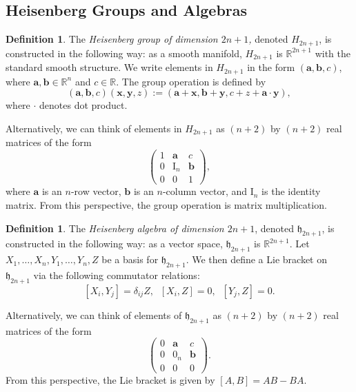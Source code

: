 \documentclass{amsart}[]
\newcommand{\R}{\mathbb R}
\theoremstyle{plain}
\theoremstyle{definition}
\newtheorem{definition}[theorem]{Definition}
\theoremstyle{remark}
\begin{document}
	\subsection{Heisenberg Groups and Algebras}
	\begin{definition}
		The \emph{Heisenberg group of dimension $2n+1$,} denoted $H_{2n+1}$, is constructed in the following way: as a smooth manifold, $H_{2n+1}$ is $\R^{2n+1}$ with the standard smooth structure. We write elements in $H_{2n+1}$ in the form $(\mathbf a, \mathbf b, c)$, where $\mathbf a, \mathbf b \in \R^n$ and $c \in \R$. The group operation is defined by
		$$(\mathbf a, \mathbf b,c ) (\mathbf x,\mathbf y,z) := (\mathbf a + \mathbf x, \mathbf b + \mathbf y, c + z + \mathbf a \cdot \mathbf y),$$
		where $\cdot$ denotes dot product. 
		
		Alternatively, we can think of elements in $H_{2n+1}$ as $(n+2)$ by $(n+2)$ real matrices of the form 
		$$\begin{pmatrix}
			1 & \mathbf a & c \\
			0 & \text{I}_n & \mathbf b \\
			0 & 0 & 1
		\end{pmatrix},$$
		where $\mathbf a$ is an $n$-row vector, $\mathbf b$ is an $n$-column vector, and $\text{I}_n$ is the identity matrix.
		From this perspective, the group operation is matrix multiplication.
	\end{definition}
	
	
	\begin{definition}
		The \emph{Heisenberg algebra of dimension $2n+1$}, denoted $\mathfrak h_{2n+1}$, is constructed in the following way: as a vector space, $\mathfrak h_{2n+1}$ is $\R^{2n+1}$. Let $X_1,\ldots, X_n,Y_1,\ldots,Y_n,Z$ be a basis for $\mathfrak h_{2n+1}$. We then define a Lie bracket on $\mathfrak h_{2n+1}$ via the following commutator relations:
		$$[X_i, Y_j] = \delta_{ij}Z, \;\; [X_i, Z] =0, \;\; [Y_j,Z] = 0.$$
		
		Alternatively, we can think of elements of $\mathfrak h_{2n+1}$ as $(n+2)$ by $(n+2)$ real matrices of the form 
		$$\begin{pmatrix}
			0 & \mathbf a & c \\
			0 & 0_n & \mathbf b \\
			0 & 0 & 0
		\end{pmatrix}.$$
		From this perspective, the Lie bracket is given by $[A,B] = AB-BA$.
	\end{definition}
	
\end{document}
